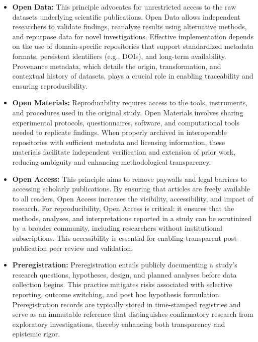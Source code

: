 \documentclass[final]{rc-book-2.14}
\begin{document}
\begin{itemize}

    \item \textbf{Open Data:} This principle advocates for unrestricted access to the raw datasets underlying scientific publications. Open Data allows independent researchers to validate findings, reanalyze results using alternative methods, and repurpose data for novel investigations. Effective implementation depends on the use of domain-specific repositories that support standardized metadata formats, persistent identifiers (e.g., DOIs), and long-term availability. Provenance metadata, which details the origin, transformation, and contextual history of datasets, plays a crucial role in enabling traceability and ensuring reproducibility.

    \item \textbf{Open Materials:} Reproducibility requires access to the tools, instruments, and procedures used in the original study. Open Materials involves sharing experimental protocols, questionnaires, software, and computational tools needed to replicate findings. When properly archived in interoperable repositories with sufficient metadata and licensing information, these materials facilitate independent verification and extension of prior work, reducing ambiguity and enhancing methodological transparency.

    \item \textbf{Open Access:} This principle aims to remove paywalls and legal barriers to accessing scholarly publications. By ensuring that articles are freely available to all readers, Open Access increases the visibility, accessibility, and impact of research. For reproducibility, Open Access is critical: it ensures that the methods, analyses, and interpretations reported in a study can be scrutinized by a broader community, including researchers without institutional subscriptions. This accessibility is essential for enabling transparent post-publication peer review and validation.

    \item \textbf{Preregistration:} Preregistration entails publicly documenting a study’s research questions, hypotheses, design, and planned analyses before data collection begins. This practice mitigates risks associated with selective reporting, outcome switching, and post hoc hypothesis formulation. Preregistration records are typically stored in time-stamped registries and serve as an immutable reference that distinguishes confirmatory research from exploratory investigations, thereby enhancing both transparency and epistemic rigor.


\end{itemize}
\end{document}
